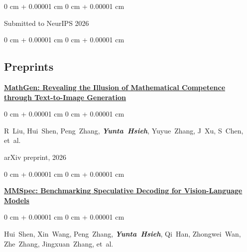 \documentclass[10pt, letterpaper]{article}
\newenvironment{onecolentry}{
    \begin{adjustwidth}{
        0 cm + 0.00001 cm
    }{
        0 cm + 0.00001 cm
    }
}{
    \end{adjustwidth}
} %
\begin{document}
\begin{samepage}
\begin{onecolentry}
                \vspace{0.05 cm}
                Submitted to NeurIPS 2026
            \end{onecolentry}
            
            \vspace{0.10 cm}
            
            \begin{onecolentry}
               \subsection*{Preprints}
                \href{https://arxiv.org/pdf/2603.27959}
                {\uline{\textbf{MathGen: Revealing the Illusion of Mathematical Competence through Text-to-Image Generation}}}
            \end{onecolentry}
            
            \vspace{0.10 cm}
            
            \begin{onecolentry}
                \mbox{R Liu}, 
                \mbox{Hui Shen}, 
                \mbox{Peng Zhang}, 
                \textbf{\textit{\mbox{Yunta Hsieh}}}, 
                \mbox{Yuyue Zhang}, 
                \mbox{J Xu}, 
                \mbox{S Chen}, 
                \mbox{et al.}
                
                \vspace{0.05 cm}
                arXiv preprint, 2026
            \end{onecolentry}
            
            \vspace{0.10 cm}
            
            \begin{onecolentry}
                \href{https://arxiv.org/pdf/2603.14989}
                {\uline{\textbf{MMSpec: Benchmarking Speculative Decoding for Vision-Language Models}}}
            \end{onecolentry}
            
            \vspace{0.10 cm}
            
            \begin{onecolentry}
                \mbox{Hui Shen}, 
                \mbox{Xin Wang}, 
                \mbox{Peng Zhang}, 
                \textbf{\textit{\mbox{Yunta Hsieh}}}, 
                \mbox{Qi Han}, 
                \mbox{Zhongwei Wan}, 
                \mbox{Zhe Zhang}, 
                \mbox{Jingxuan Zhang}, 
                \mbox{et al.}
                

\end{onecolentry}
\end{samepage}
\end{document}
